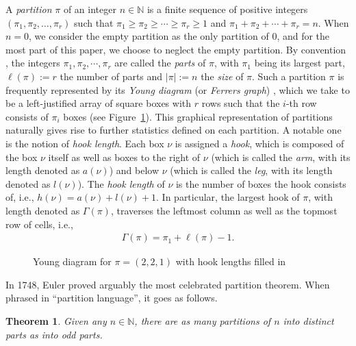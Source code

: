 \documentclass[12pt]{amsart}
\numberwithin{equation}{section}
\theoremstyle{plain}
\newtheorem{theorem}{Theorem}[section]
\theoremstyle{definition}
\newcommand{\N}{\mathbb{N}}
\begin{document}
A \emph{partition} \cite{Andr} $\pi$ of an integer $n\in\N$ is a finite sequence of positive integers $(\pi_{1}, \pi_{2}, \ldots, \pi_{r})$ such that $\pi_{1}\geq \pi_{2}\geq\cdots\geq \pi_{r}\geq 1$ and $\pi_{1}+\pi_{2}+\cdots+\pi_{r}=n$. When $n=0$, we consider the empty partition as the only partition of $0$, and for the most part of this paper, we choose to neglect the empty partition. By convention \cite{Andr}, the integers $\pi_{1}, \pi_{2}, \cdots, \pi_{r}$ are called the \emph{parts} of $\pi$, with $\pi_{1}$ being its largest part, $\ell(\pi):=r$ the number of parts and $|\pi|:=n$ the \emph{size} of $\pi$. Such a partition $\pi$ is frequently represented by its \emph{Young diagram} (or \emph{Ferrers graph}) \cite[Chapter 1.3]{Andr}, which we take to be a left-justified array of square boxes with $r$ rows such that the $i$-th row consists of $\pi_{i}$ boxes (see Figure~\ref{yd}). This graphical representation of partitions naturally gives rise to further statistics defined on each partition. A notable one is the notion of \emph{hook length}. Each box $\nu$ is assigned a \emph{hook}, which is composed of the box $\nu$ itself as well as boxes to the right of $\nu$ (which is called the \emph{arm}, with its length denoted as $a(\nu)$) and below $\nu$ (which is called the \emph{leg}, with its length denoted as $l(\nu)$). The \emph{hook length} of $\nu$ is the number of boxes the hook consists of, i.e., $h(\nu)=a(\nu)+l(\nu)+1$. In particular, the largest hook of $\pi$, with length denoted as $\Gamma(\pi)$, traverses the leftmost column as well as the topmost row of cells, i.e.,
\begin{align}\label{Gamma}
\Gamma(\pi)=\pi_1+\ell(\pi)-1.
\end{align}






\begin{figure}
\caption{Young diagram for $\pi=(2,2,1)$ with hook lengths filled in}
\label{yd}
\end{figure}

In 1748, Euler \cite{Eu} proved arguably the most celebrated partition theorem. When phrased in ``partition language'', it goes as follows.
\begin{theorem}\label{od}
Given any $n\in\N$, there are as many partitions of $n$ into distinct parts as into odd parts.
\end{theorem}
\end{document}
